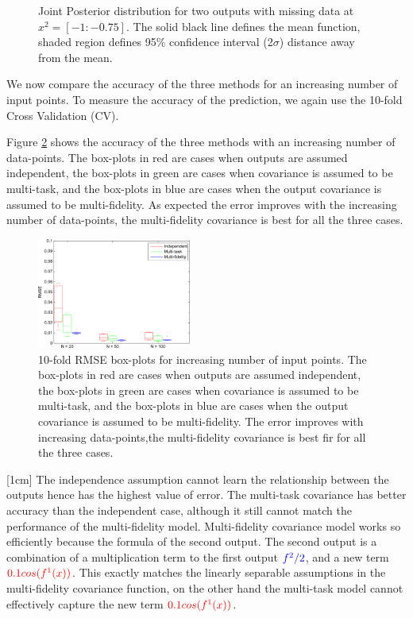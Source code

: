 \begin{figure}[!ht]
       \caption{Joint Posterior distribution for two outputs with missing data at $x^2 = [-1:-0.75]$. The solid black line defines the mean function, shaded region defines 95\% confidence interval (2$\sigma$) distance away from the mean.}
       \label{figJointPosteriorDistribution}
\end{figure}

\begin{mdframed}[hidealllines=true,backgroundcolor=lightgray!20]
We now compare the accuracy of the three methods for an increasing number of input points. To measure the accuracy of the prediction, we again use the 10-fold Cross Validation (CV).   

Figure \ref{subFigboxPlotsToyDataJoint} shows the accuracy of the three methods with an increasing number of data-points. The box-plots in red are cases when outputs are assumed independent, the box-plots in green are cases when covariance is assumed to be multi-task, and the box-plots in blue are cases when the output covariance is assumed to be multi-fidelity. As expected the error improves with the increasing number of data-points, the multi-fidelity covariance is best for all the three cases.
\end{mdframed}

\begin{figure}[!ht]
  \centering
    
        \includegraphics[width=0.45\textwidth]
        {images/part3/boxPlotsToyDataProgressionOverTime}
        \caption{10-fold RMSE box-plots for increasing number of input points. The box-plots in red are cases when outputs are assumed independent, the box-plots in green are cases when covariance is assumed to be multi-task, and the box-plots in blue are cases when the output covariance is assumed to be multi-fidelity. The error improves with increasing data-points,the multi-fidelity covariance is best fir for all the three cases.}
        \label{subFigboxPlotsToyDataJoint}
\end{figure}

[1cm]
The independence assumption cannot learn the relationship between the outputs hence has the highest value of error. The multi-task covariance has better accuracy than the independent case, although it still cannot match the performance of the multi-fidelity model.  Multi-fidelity covariance model works so efficiently because the formula of the second output. The second output is a combination of a multiplication term to the first output $\textcolor{blue}{f^2/2}$, and a new term $\textcolor{red}{0.1cos(f^{1}(x))}$. This exactly matches the linearly separable assumptions in the multi-fidelity covariance function, on the other hand the multi-task model cannot effectively capture the new term $\textcolor{red}{0.1cos(f^{1}(x))}$.

